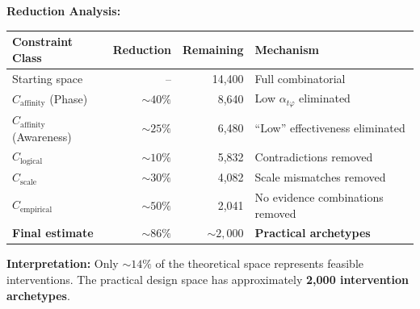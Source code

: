 \begin{tcolorbox}[colback=green!5!white, colframe=green!75!black,
    title=\textbf{Result: Estimated Feasible Space Size}]

\textbf{Reduction Analysis:}

\begin{table}[H]
\centering
\begin{tabular}{@{}lrrl@{}}
\toprule
\textbf{Constraint Class} & \textbf{Reduction} & \textbf{Remaining} & \textbf{Mechanism} \\
\midrule
Starting space & -- & 14,400 & Full combinatorial \\
$C_{\text{affinity}}$ (Phase) & $\sim 40\%$ & 8,640 & Low $\alpha_{t\varphi}$ eliminated \\
$C_{\text{affinity}}$ (Awareness) & $\sim 25\%$ & 6,480 & ``Low'' effectiveness eliminated \\
$C_{\text{logical}}$ & $\sim 10\%$ & 5,832 & Contradictions removed \\
$C_{\text{scale}}$ & $\sim 30\%$ & 4,082 & Scale mismatches removed \\
$C_{\text{empirical}}$ & $\sim 50\%$ & 2,041 & No evidence combinations removed \\
\midrule
\textbf{Final estimate} & $\sim 86\%$ & $\sim 2{,}000$ & \textbf{Practical archetypes} \\
\bottomrule
\end{tabular}
\end{table}

\textbf{Interpretation:} Only $\sim 14\%$ of the theoretical space represents feasible interventions. The practical design space has approximately \textbf{2,000 intervention archetypes}.

\end{tcolorbox}

